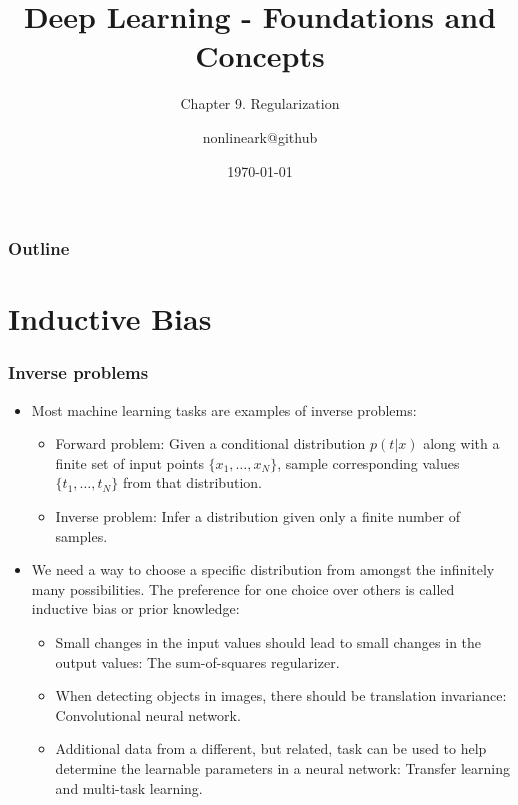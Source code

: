 \documentclass{beamer}
\title{Deep Learning - Foundations and Concepts}
\subtitle{Chapter 9. Regularization}
\author{nonlineark@github}
\date{\today}
\begin{document}
\begin{frame}
    \titlepage
\end{frame}

\begin{frame}
    \frametitle{Outline}
    \tableofcontents
\end{frame}

\section{Inductive Bias}

\begin{frame}
    \frametitle{Inverse problems}
    \begin{itemize}
        \item Most machine learning tasks are examples of inverse problems:
        \begin{itemize}
            \item Forward problem: Given a conditional distribution $p(t|x)$ along with a finite set of input points $\{x_{1},\hdots,x_{N}\}$, sample corresponding values $\{t_{1},\hdots,t_{N}\}$ from that distribution.
            \item Inverse problem: Infer a distribution given only a finite number of samples.
        \end{itemize}
        \item We need a way to choose a specific distribution from amongst the infinitely many possibilities. The preference for one choice over others is called inductive bias or prior knowledge:
        \begin{itemize}
            \item Small changes in the input values should lead to small changes in the output values: The sum-of-squares regularizer.
            \item When detecting objects in images, there should be translation invariance: Convolutional neural network.
            \item Additional data from a different, but related, task can be used to help determine the learnable parameters in a neural network: Transfer learning and multi-task learning.
        \end{itemize}
    \end{itemize}
\end{frame}
\end{document}
